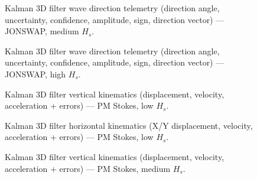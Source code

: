 \documentclass[11pt,letterpaper]{article}
\begin{document}
\begin{figure}[H]\centering
  \resizebox{\textwidth}{!}{}
  \caption{Kalman 3D filter wave direction telemetry (direction angle, uncertainty, confidence, amplitude, sign, direction vector) — JONSWAP, medium $H_s$.}
  \label{fig:w3d_jonswap_medium_dir}
\end{figure}

\begin{figure}[H]\centering
  \resizebox{\textwidth}{!}{}
  \caption{Kalman 3D filter wave direction telemetry (direction angle, uncertainty, confidence, amplitude, sign, direction vector) — JONSWAP, high $H_s$.}
  \label{fig:w3d_jonswap_high_dir}
\end{figure}





\begin{figure}[H]\centering
  \resizebox{\textwidth}{!}{}
  \caption{Kalman 3D filter vertical kinematics (displacement, velocity, acceleration + errors) — PM Stokes, low $H_s$.}
  \label{fig:w3d_pmstokes_low_zkin}
\end{figure}

\begin{figure}[H]\centering
  \resizebox{\textwidth}{!}{}
  \caption{Kalman 3D filter horizontal kinematics (X/Y displacement, velocity, acceleration + errors) — PM Stokes, low $H_s$.}
  \label{fig:w3d_pmstokes_low_xykin}
\end{figure}


\begin{figure}[H]\centering
  \resizebox{\textwidth}{!}{}
  \caption{Kalman 3D filter vertical kinematics (displacement, velocity, acceleration + errors) — PM Stokes, medium $H_s$.}
  \label{fig:w3d_pmstokes_medium_zkin}
\end{figure}
\end{document}
